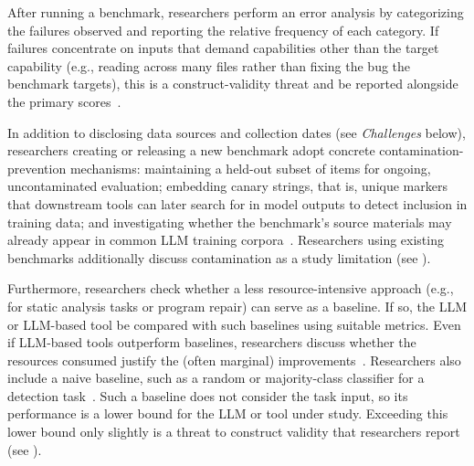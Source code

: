 After running a benchmark, researchers \should perform an error analysis by categorizing the failures observed and reporting the relative frequency of each category. If failures concentrate on inputs that demand capabilities other than the target capability (e.g., reading across many files rather than fixing the bug the benchmark targets), this is a construct-validity threat and \should be reported alongside the primary scores~\cite{bean2025measuring}.

In addition to disclosing data sources and collection dates (see \emph{Challenges} below), researchers creating or releasing a new benchmark \should adopt concrete contamination-prevention mechanisms: maintaining a held-out subset of items for ongoing, uncontaminated evaluation; embedding canary strings, that is, unique markers that downstream tools can later search for in model outputs to detect inclusion in training data; and investigating whether the benchmark's source materials may already appear in common LLM training corpora~\cite{bean2025measuring, cao2025should}. Researchers using existing benchmarks \should additionally discuss contamination as a study limitation (see \limitationsmitigations).

Furthermore, researchers \should check whether a less resource-intensive approach (e.g., for static analysis tasks or program repair) can serve as a baseline. If so, the LLM or LLM-based tool \should be compared with such baselines using suitable metrics. Even if LLM-based tools outperform baselines, researchers \should discuss whether the resources consumed justify the (often marginal) improvements~\cite{DBLP:journals/cacm/Menzies25}.
Researchers \should also include a naive baseline, such as a random or majority-class classifier for a detection task~\cite{Izadi2026benchmarking}. Such a baseline does not consider the task input, so its performance is a lower bound for the LLM or tool under study. Exceeding this lower bound only slightly is a threat to construct validity that researchers \must report (see \limitationsmitigations).

